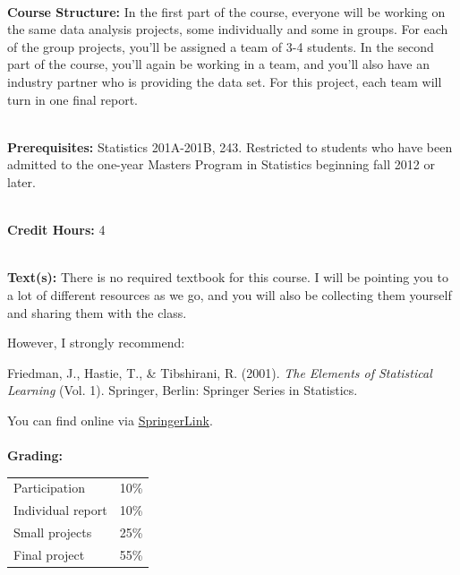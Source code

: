 \documentclass[11pt]{article}
\begin{document}
\textbf {\large \\ Course Structure:}
In the first part of the course, everyone will be working on the same data
analysis projects, some individually and some in groups. For each of the group
projects, you'll be assigned a team of 3-4 students.  In the second part of
the course, you'll again be working in a team, and you'll also have an industry
partner who is providing the data set. For this project, each team will turn in
one final report.

\textbf {\large \\ Prerequisites:}
Statistics 201A-201B, 243. Restricted to students who have been admitted to
the one-year Masters Program in Statistics beginning fall 2012 or later.

\textbf {\large \\ Credit Hours:} 4

\textbf {\large \\ Text(s):} 
There is no required textbook for this course.  I will be pointing you to a lot
of different resources as we go, and you will also be collecting them yourself
and sharing them with the class.

However, I strongly recommend:

\vspace{2mm}

Friedman, J., Hastie, T., \& Tibshirani, R. (2001). \emph{The Elements of Statistical Learning}
(Vol. 1). Springer, Berlin: Springer Series in Statistics.

\vspace{2mm}

You can find online via \href{http://link.springer.com/book/10.1007\%2F978-0-387-21606-5}{SpringerLink}. \\

\textbf {\large \\ Grading:}
\hspace*{40mm}
\begin{tabular}{ l l }
Participation  & 10\% \\
Individual report  & 10\% \\
Small projects & 25\% \\
Final project  & 55\%
\end{tabular} \\\\

\end{document}
